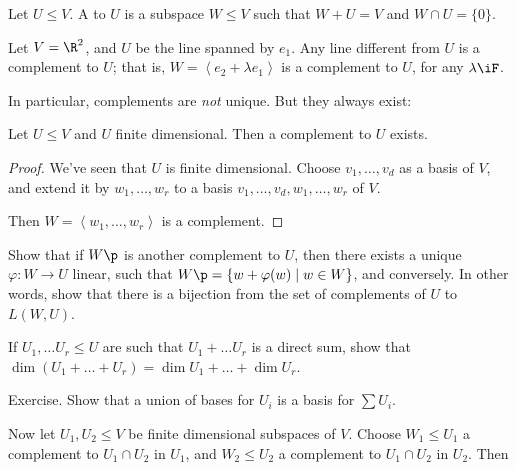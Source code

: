 \begin{definition}
	Let $U\leq V$. A  to $U$ is a subspace $W\leq V$ such that $W+U=V$ and $W\cap U=\{0\}$. %
\end{definition}

\begin{example}
	Let $V=\R^2$, and $U$ be the line spanned by $e_1$. Any line different from $U$ is a complement to $U$; that is, $W=\left\langle e_2+\lambda e_1 \right\rangle$ is a complement to $U$, for any $\lambda\iF$. %
\end{example}

In particular, complements are \emph{not} unique. But they always exist:

\begin{lemma}
	Let $U\leq V$ and $U$ finite dimensional. Then a complement to $U$ exists. %
\end{lemma}

\begin{proof}
	We've seen that $U$ is finite dimensional. Choose $v_1,\ldots,v_d$ as a basis of $V$, and extend it by $w_1,\ldots,w_r$ to a basis $v_1,\ldots,v_d,w_1,\ldots,w_r$ of $V$. %
	
	Then $W=\left\langle w_1,\ldots,w_r \right\rangle$ is a complement.
\end{proof}

\begin{exercise}
	Show that if $W\p$ is another complement to $U$, then there exists a unique $\varphi:W\to U$ linear, such that $W\p=\left\{w+\varphi(w)\mid w\in W\right\}$, and conversely. In other words, show that there is a bijection from the set of complements of $U$ to $L(W,U)$. %
\end{exercise}

\begin{lemma}
	If $U_1,\dots U_r \leq U$ are such that $U_1 + \dots U_r$ is a direct sum, show that $\dim (U_1 + \dots + U_r) = \dim U_1 + \dots +\dim U_r$. %
\end{lemma}

\begin{proof*}
	Exercise. Show that a union of bases for $U_i$ is a basis for $\sum U_i$.
\end{proof*}

Now let $U_1,U_2\leq V$ be finite dimensional subspaces of $V$. Choose $W_1\leq U_1$ a complement to $U_1\cap U_2$ in $U_1$, and $W_2\leq U_2$ a complement to $U_1\cap U_2$ in $U_2$. Then

